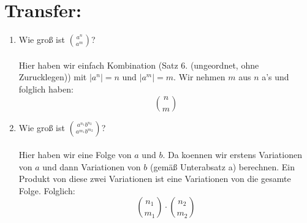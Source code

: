     \section*{Transfer:}
    \begin{enumerate}[label=(\alph*)]
        \item Wie groß ist $\binom{a^n}{a^m}$? \\\\
        Hier haben wir einfach Kombination (Satz 6. (ungeordnet, ohne Zurucklegen)) mit $|a^n| = n$ und 
        $|a^m| = m$. Wir nehmen $m$ aus $n$ a's und folglich haben: 
        \[\binom{n}{m}\]

        \item Wie groß ist $\binom{a^{n_1}b^{n_2}}{a^{m_1}b^{m_2}}$? \\\\
        Hier haben wir eine Folge von $a$ und $b$. Da koennen wir erstens Variationen von $a$ und dann 
        Variationen von $b$ (gemäß Unterabsatz a) berechnen. Ein Produkt von diese zwei Variationen ist 
        eine Variationen von die gesamte Folge. Folglich:
        \[\binom{n_1}{m_1} \cdot \binom{n_2}{m_2} \]
    \end{enumerate} 
